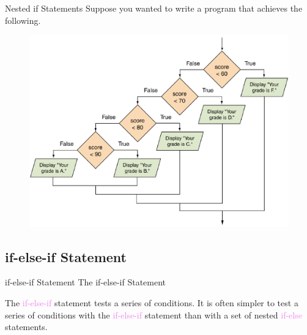 \documentclass[11pt]{beamer}
\newcommand{\violet}[1]{\textcolor{violet}{#1}}
\begin{document}
\begin{frame}{Nested if Statements}
    Suppose you wanted to write a program that achieves the following.
    \noindent 
    \begin{figure}[H]
    \centering
    \includegraphics[scale=0.25]{Images/chapter03_nestedIfGradeProgram.png}
    \end{figure}
\end{frame}


\subsection{if-else-if Statement}
\begin{frame}{if-else-if Statement}
    The if-else-if Statement
    \begin{center}
        The \violet{if-else-if} statement tests a series of conditions. It is often simpler to test a series of conditions with the \violet{if-else-if} statement than with a set of nested \violet{if-else} statements.
    \end{center}
\end{frame}
\end{document}
